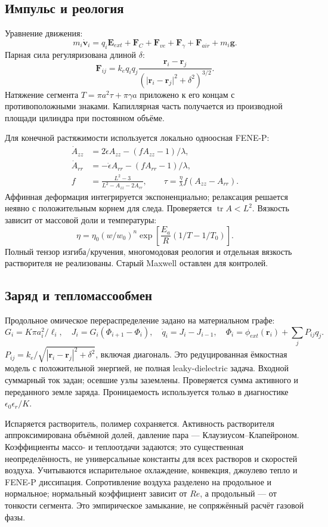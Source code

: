 \documentclass[12pt,a4paper]{article}
\begin{document}
\subsection{Импульс и реология}
Уравнение движения:
\[
 m_i\dot{\mathbf v}_i=q_i\mathbf E_{ext}+\mathbf F_C+
 \mathbf F_{ve}+\mathbf F_\gamma+\mathbf F_{air}+m_i\mathbf g.
\]
Парная сила регуляризована длиной $\delta$:
\[
 \mathbf F_{ij}=k_e q_iq_j\frac{\mathbf r_i-\mathbf r_j}
 {(\lvert\mathbf r_i-\mathbf r_j\rvert^2+\delta^2)^{3/2}}.
\]
Натяжение сегмента $T=\pi a^2\tau+\pi\gamma a$ приложено к его концам
с противоположными знаками. Капиллярная часть получается из производной
площади цилиндра при постоянном объёме.

Для конечной растяжимости используется локально одноосная FENE-P:
\begin{align*}
 \dot A_{zz}&=2\dot\epsilon A_{zz}-(fA_{zz}-1)/\lambda,\\
 \dot A_{rr}&=-\dot\epsilon A_{rr}-(fA_{rr}-1)/\lambda,\\
 f&=\frac{L^2-3}{L^2-A_{zz}-2A_{rr}},\qquad
 \tau=\frac{\eta}{\lambda}f(A_{zz}-A_{rr}).
\end{align*}
Аффинная деформация интегрируется экспоненциально; релаксация решается
неявно с положительным корнем для следа. Проверяется $\operatorname{tr}A<L^2$.
Вязкость зависит от массовой доли и температуры:
\[
 \eta=\eta_0(w/w_0)^n\exp\left[\frac{E_a}{R}(1/T-1/T_0)\right].
\]
Полный тензор изгиба/кручения, многомодовая реология и отдельная вязкость
растворителя не реализованы. Старый Maxwell оставлен для контролей.

\subsection{Заряд и тепломассообмен}
Продольное омическое перераспределение задано на материальном графе:
\[
 G_i=K\pi a_i^2/\ell_i,\quad J_i=G_i(\Phi_{i+1}-\Phi_i),\quad
 \dot q_i=J_i-J_{i-1},\quad
 \Phi_i=\phi_{ext}(\mathbf r_i)+\sum_j P_{ij}q_j.
\]
$P_{ij}=k_e/\sqrt{|\mathbf r_i-\mathbf r_j|^2+\delta^2}$, включая диагональ.
Это редуцированная ёмкостная модель с положительной энергией, не полная
leaky-dielectric задача. Входной суммарный ток задан; осевшие узлы заземлены.
Проверяется сумма активного и переданного земле заряда. Проницаемость
используется только в диагностике $\epsilon_0\epsilon_r/K$.

Испаряется растворитель, полимер сохраняется. Активность растворителя
аппроксимирована объёмной долей, давление пара — Клаузиусом--Клапейроном.
Коэффициенты массо- и теплоотдачи задаются; это существенная неопределённость,
не универсальные константы для всех растворов и скоростей воздуха.
Учитываются испарительное охлаждение, конвекция, джоулево тепло и FENE-P
диссипация. Сопротивление воздуха разделено на продольное и нормальное;
нормальный коэффициент зависит от $Re$, а продольный — от тонкости сегмента.
Это эмпирическое замыкание, не сопряжённый расчёт газовой фазы.
\end{document}
